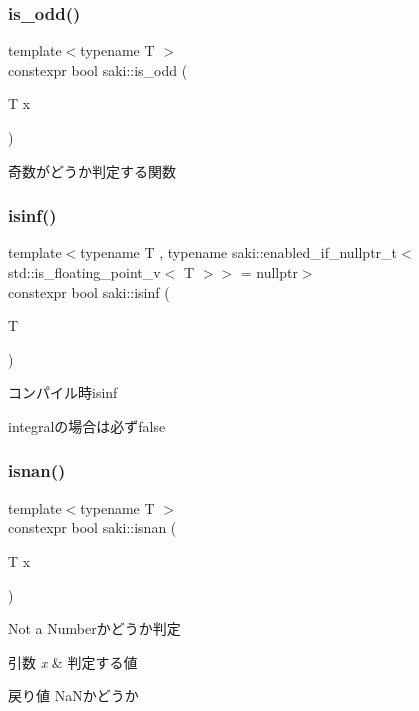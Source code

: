 \subsubsection{\texorpdfstring{is\+\_\+odd()}{is\_odd()}}
{\footnotesize\ttfamily template$<$typename T $>$ \\
constexpr bool saki\+::is\+\_\+odd (\begin{DoxyParamCaption}\item[{T}]{x }\end{DoxyParamCaption})}



奇数がどうか判定する関数 

\mbox{\label{namespacesaki_a2168418bb30a857d2d018d0d05c7ace0}} 
\subsubsection{\texorpdfstring{isinf()}{isinf()}}
{\footnotesize\ttfamily template$<$typename T , typename saki\+::enabled\+\_\+if\+\_\+nullptr\+\_\+t$<$ std\+::is\+\_\+floating\+\_\+point\+\_\+v$<$ T $>$$>$  = nullptr$>$ \\
constexpr bool saki\+::isinf (\begin{DoxyParamCaption}\item[{T}]{ }\end{DoxyParamCaption})}



コンパイル時isinf 

integralの場合は必ずfalse \mbox{\label{namespacesaki_a56ac7ef1477743d3bb044e2cf8f6d612}} 
\subsubsection{\texorpdfstring{isnan()}{isnan()}}
{\footnotesize\ttfamily template$<$typename T $>$ \\
constexpr bool saki\+::isnan (\begin{DoxyParamCaption}\item[{T}]{x }\end{DoxyParamCaption})}



Not a Numberかどうか判定 


\begin{DoxyParams}{引数}
{\em x} & 判定する値 \\
\hline
\end{DoxyParams}
\begin{DoxyReturn}{戻り値}
Na\+Nかどうか 
\end{DoxyReturn}
\mbox{\label{namespacesaki_a03b7a22945dcbce6e2bb0593025c90c4}} 
